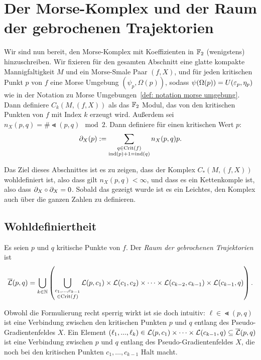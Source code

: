 \section{Der Morse-Komplex und der Raum der gebrochenen Trajektorien}

Wir sind nun bereit, den Morse-Komplex mit Koeffizienten in ${ \mathbb F }_2$ (wenigstens) hinzuschreiben.
Wir fixieren für den gesamten Abschnitt eine glatte kompakte Mannigfaltigkeit $M$ und ein
Morse-Smale Paar $(f, X)$, und für jeden kritischen Punkt $p$ von $f$ eine Morse Umgebung 
$(\psi_p, \Omega(p))$, sodass $\psi(\Omega(p)) = U(\varepsilon_p, \eta_p)$ wie in der Notation zu Morse 
Umgebungen~\ref{def: notation morse umgebung}. Dann definiere $C_k (M, (f, X))$ als das ${ \mathbb F }_2$ Modul, 
das von den kritischen Punkten von $f$ mit Index $k$ erzeugt wird. Außerdem sei 
$n_X(p, q) = \# \Lt (p, q) \mod 2$. Dann definiere für einen kritischen Wert $p$:
\[ { \partial }_X (p) := \sum_{\substack{ q \in { \operatorname{Crit} }(f) \\ { \operatorname{ind} } (p) + 1 = { \operatorname{ind} } (q) }} n_X(p, q)p . \]

Das Ziel dieses Abschnittes ist es zu zeigen, dass der Komplex $C_{\ast}(M, (f, X))$ wohldefiniert
ist, also dass gilt $n_X (p, q) < \infty$, und dass es ein Kettenkomple ist, also dass 
${ \partial }_X \circ { \partial }_X = 0$. Sobald das gezeigt wurde ist es ein Leichtes, den Komplex auch über die 
ganzen Zahlen zu definieren.

\subsection*{Wohldefiniertheit}

\begin{definition}
    \label{def: raum der gebrochenen trajektorien}
    Es seien $p$ und $q$ kritische Punkte von $f$. Der \textit{Raum der gebrochenen Trajektorien} ist
    \[ {\overline{\mathcal{L}} } (p, q) = 
        \bigcup_{k \in { \mathbb N }} \left( \bigcup_{\substack{c_1, \dots, c_{k - 1} \\ \in { \operatorname{Crit} }(f)}} 
            { \mathcal{L} } (p, c_1) \times { \mathcal{L} } (c_1, c_2) \times \dots 
                \times { \mathcal{L} } (c_{k - 2}, c_{k - 1}) \times { \mathcal{L} } (c_{k - 1}, q) \right) . \]
\end{definition}

Obwohl die Formulierung recht sperrig wirkt ist sie doch intuitiv: 
$\ell \in \Lt (p, q)$ ist eine \glqq Verbindung\grqq{} zwischen den kritischen Punkten $p$ und $q$ 
entlang des Pseudo-Gradientenfeldes $X$. Ein Element 
$(\ell_1, ..., \ell_k) \in { \mathcal{L} } (p, c_1) \times \dots \times { \mathcal{L} } (c_{k - 1}, q) \subseteq {\overline{\mathcal{L}} } (p, q)$
ist eine \glqq Verbindung\grqq{} zwischen $p$ und $q$ entlang des Pseudo-Gradientenfeldes $X$, die noch 
bei den kritischen Punkten $c_1, \dots, c_{k - 1}$ \glqq Halt\grqq{} macht. 

